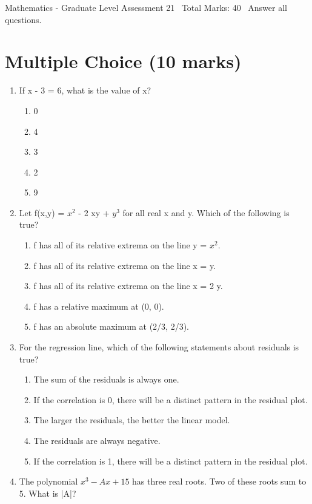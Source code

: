\documentclass[12pt]{article}
\begin{document}
\begin{center}
Mathematics - Graduate Level Assessment 21 \
Total Marks: 40 \
Answer all questions.
\end{center}

\section*{Multiple Choice (10 marks)}
\begin{enumerate}[label=\arabic*.]
\item If x - 3 = 6, what is the value of x?
\begin{enumerate}[label=(\alph*)]
    \item 0
    \item 4
    \item 3
    \item 2
    \item 9
\end{enumerate}
\item Let f(x,y) = $x^2$ - 2 xy + $y^3$ for all real x and y. Which of the following is true?
\begin{enumerate}[label=(\alph*)]
    \item f has all of its relative extrema on the line y = $x^2$.
    \item f has all of its relative extrema on the line x = y.
    \item f has all of its relative extrema on the line x = 2 y.
    \item f has a relative maximum at (0, 0).
    \item f has an absolute maximum at (2/3, 2/3).
\end{enumerate}
\item For the regression line, which of the following statements about residuals is true?
\begin{enumerate}[label=(\alph*)]
    \item The sum of the residuals is always one.
    \item If the correlation is 0, there will be a distinct pattern in the residual plot.
    \item The larger the residuals, the better the linear model.
    \item The residuals are always negative.
    \item If the correlation is 1, there will be a distinct pattern in the residual plot.
\end{enumerate}
\item The polynomial $x^3 - Ax + 15$ has three real roots. Two of these roots sum to 5. What is |A|?

\end{enumerate}
\end{document}
